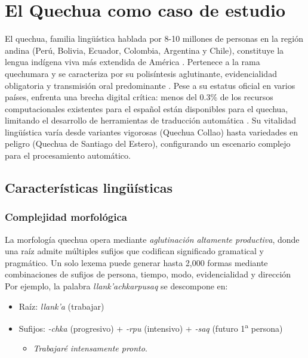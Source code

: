 \chapter{El Quechua como caso de estudio}
    El quechua, familia lingüística hablada por 8-10 millones de personas en la región andina (Perú, Bolivia, Ecuador, Colombia, Argentina y Chile), constituye la lengua indígena viva más extendida de América \cite{adelaar2004}. Pertenece a la rama quechumara y se caracteriza por su polisíntesis aglutinante, evidencialidad obligatoria y transmisión oral predominante \cite{cerron2003linguistica}. Pese a su estatus oficial en varios países, enfrenta una brecha digital crítica: menos del 0.3\% de los recursos computacionales existentes para el español están disponibles para el quechua, limitando el desarrollo de herramientas de traducción automática \cite{rios2015basic}. Su vitalidad lingüística varía desde variantes vigorosas (Quechua Collao) hasta variedades en peligro (Quechua de Santiago del Estero), configurando un escenario complejo para el procesamiento automático.
    
    \section{Características lingüísticas}
    
        \subsection{Complejidad morfológica}
        La morfología quechua opera mediante \textit{aglutinación altamente productiva}, donde una raíz admite múltiples sufijos que codifican significado gramatical y pragmático. Un solo lexema puede generar hasta 2,000 formas mediante combinaciones de sufijos de persona, tiempo, modo, evidencialidad y dirección \cite{adelaar2004} Por ejemplo, la palabra \textit{llank'achkarpusaq} se descompone en:

        \begin{itemize}
            \item Raíz: \textit{llank'a} (trabajar)
            \item Sufijos: \textit{-chka} (progresivo) + \textit{-rpu} (intensivo) + \textit{-saq} (futuro 1\textsuperscript{a} persona)
            \begin{itemize}
                \item \textit{Trabajaré intensamente pronto}.
            \end{itemize}
        \end{itemize}
        
